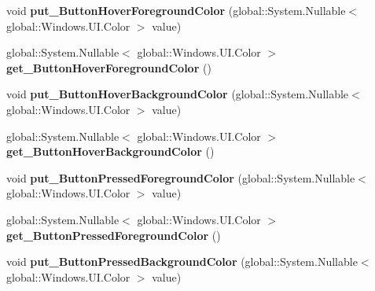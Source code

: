 \begin{DoxyCompactItemize}
void {\bfseries put\+\_\+\+Button\+Hover\+Foreground\+Color} (global\+::\+System.\+Nullable$<$ global\+::\+Windows.\+U\+I.\+Color $>$ value)
\item 
\mbox{\label{class_windows_1_1_u_i_1_1_view_management_1_1_application_view_title_bar_abb2bd226eff90e756e30fce411565e04}} 
global\+::\+System.\+Nullable$<$ global\+::\+Windows.\+U\+I.\+Color $>$ {\bfseries get\+\_\+\+Button\+Hover\+Foreground\+Color} ()
\item 
\mbox{\label{class_windows_1_1_u_i_1_1_view_management_1_1_application_view_title_bar_aab71134c8d012975419633c926f62d40}} 
void {\bfseries put\+\_\+\+Button\+Hover\+Background\+Color} (global\+::\+System.\+Nullable$<$ global\+::\+Windows.\+U\+I.\+Color $>$ value)
\item 
\mbox{\label{class_windows_1_1_u_i_1_1_view_management_1_1_application_view_title_bar_ad8730e54e00f186ed98dfd21d624e119}} 
global\+::\+System.\+Nullable$<$ global\+::\+Windows.\+U\+I.\+Color $>$ {\bfseries get\+\_\+\+Button\+Hover\+Background\+Color} ()
\item 
\mbox{\label{class_windows_1_1_u_i_1_1_view_management_1_1_application_view_title_bar_a435e7ae01a4b3ea59a80006b81279ccb}} 
void {\bfseries put\+\_\+\+Button\+Pressed\+Foreground\+Color} (global\+::\+System.\+Nullable$<$ global\+::\+Windows.\+U\+I.\+Color $>$ value)
\item 
\mbox{\label{class_windows_1_1_u_i_1_1_view_management_1_1_application_view_title_bar_a59124291680af5093b2aa92987f61c76}} 
global\+::\+System.\+Nullable$<$ global\+::\+Windows.\+U\+I.\+Color $>$ {\bfseries get\+\_\+\+Button\+Pressed\+Foreground\+Color} ()
\item 
\mbox{\label{class_windows_1_1_u_i_1_1_view_management_1_1_application_view_title_bar_ac6b52566c45f42efc81c9a0e973afa85}} 
void {\bfseries put\+\_\+\+Button\+Pressed\+Background\+Color} (global\+::\+System.\+Nullable$<$ global\+::\+Windows.\+U\+I.\+Color $>$ value)

\end{DoxyCompactItemize}
